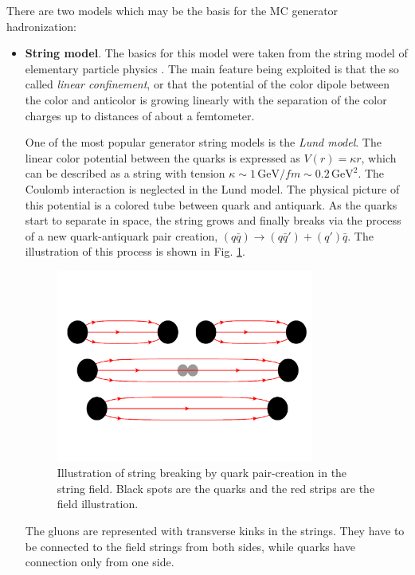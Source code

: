 There are two models which may be the basis for the MC generator hadronization:

\begin{itemize}
 \item \textbf{String model}. The basics for this model were taken from the string model of elementary particle physics \cite{Artru:1974hr}.
 The main feature being exploited is that the so called \textit{linear confinement}, or that the potential of the color dipole 
 between the color and anticolor is growing linearly with the separation of the color charges up to distances of about a femtometer.
 
 One of the most popular generator string models is the \textit{Lund model}. The linear color potential between the quarks is 
 expressed as $V(r) = \kappa r$, which can be described as a string with tension $\kappa \sim 1\,\text{GeV}/fm \sim 0.2\,\text{GeV}^{2}$. 
 The Coulomb interaction is neglected in the Lund model. The physical picture of this potential is a colored tube between quark
 and antiquark. As the quarks start to separate in space, the string grows and finally breaks via the process of a new quark-antiquark
 pair creation, $(q\bar{q}) \rightarrow (q\bar{q}') + (q')\bar{q}$. The illustration of this process is shown in Fig. \ref{fig:Lund}.
 
 \begin{figure}[h]
  \centering
  \includegraphics[width=0.8\textwidth]{03_simulation/plots/Lund_hadr.pdf}
  \caption{Illustration of string breaking by quark pair-creation in the string field. Black spots are the quarks and the red
  strips are the field illustration.}
  \label{fig:Lund}
 \end{figure}
 
 The gluons are represented with transverse kinks in the strings. They have to be connected to the field strings from both
 sides, while quarks have connection only from one side.
 

\end{itemize}

